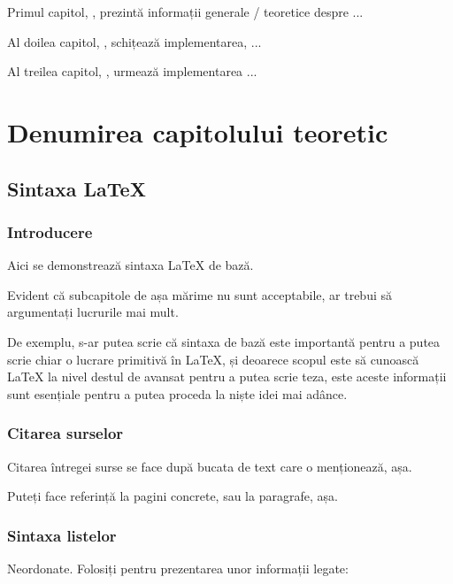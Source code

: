 \documentclass[a4paper,12pt]{report}
\begin{document}
Primul capitol, , prezintă informații generale / teoretice despre ...

Al doilea capitol, , schițează implementarea, ...

Al treilea capitol, , urmează implementarea ...

\chapter{Denumirea capitolului teoretic}\label{intro_chapter_title}

\section{Sintaxa \LaTeX{}}

\subsection{Introducere}

Aici se demonstrează sintaxa \LaTeX{} de bază.

Evident că subcapitole de așa mărime nu sunt acceptabile, 
ar trebui să argumentați lucrurile mai mult.

De exemplu, s-ar putea scrie că sintaxa de bază este importantă
pentru a putea scrie chiar o lucrare primitivă în \LaTeX{}, și deoarece
scopul este să cunoască \LaTeX{} la nivel destul de avansat pentru a putea
scrie teza, este aceste informații sunt esențiale pentru a putea proceda la
niște idei mai adânce.

\subsection{Citarea surselor}

Citarea întregei surse se face după bucata de text care o menționează, așa\cite{gif_unusable_reason}.

Puteți face referință la pagini concrete, sau la paragrafe, așa\cite[12.2.]{png_spec}.

\subsection{Sintaxa listelor}

Neordonate. Folosiți pentru prezentarea unor informații legate:
\end{document}
